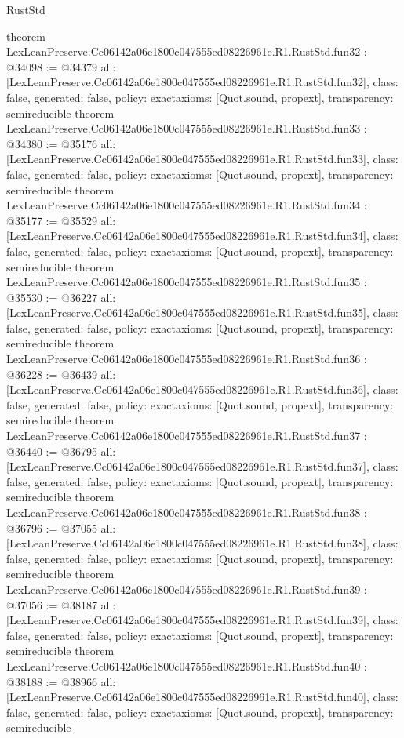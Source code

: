 \begin{lexlean}{RustStd}
\begin{coremodule}
{}
theorem LexLeanPreserve.Cc06142a06e1800c047555ed08226961e.R1.RustStd.fun32 : @34098 := @34379 {
  all: [LexLeanPreserve.Cc06142a06e1800c047555ed08226961e.R1.RustStd.fun32],
  class: false,
  generated: false,
  policy: exact{axioms: [Quot.sound, propext]},
  transparency: semireducible
}
theorem LexLeanPreserve.Cc06142a06e1800c047555ed08226961e.R1.RustStd.fun33 : @34380 := @35176 {
  all: [LexLeanPreserve.Cc06142a06e1800c047555ed08226961e.R1.RustStd.fun33],
  class: false,
  generated: false,
  policy: exact{axioms: [Quot.sound, propext]},
  transparency: semireducible
}
theorem LexLeanPreserve.Cc06142a06e1800c047555ed08226961e.R1.RustStd.fun34 : @35177 := @35529 {
  all: [LexLeanPreserve.Cc06142a06e1800c047555ed08226961e.R1.RustStd.fun34],
  class: false,
  generated: false,
  policy: exact{axioms: [Quot.sound, propext]},
  transparency: semireducible
}
theorem LexLeanPreserve.Cc06142a06e1800c047555ed08226961e.R1.RustStd.fun35 : @35530 := @36227 {
  all: [LexLeanPreserve.Cc06142a06e1800c047555ed08226961e.R1.RustStd.fun35],
  class: false,
  generated: false,
  policy: exact{axioms: [Quot.sound, propext]},
  transparency: semireducible
}
theorem LexLeanPreserve.Cc06142a06e1800c047555ed08226961e.R1.RustStd.fun36 : @36228 := @36439 {
  all: [LexLeanPreserve.Cc06142a06e1800c047555ed08226961e.R1.RustStd.fun36],
  class: false,
  generated: false,
  policy: exact{axioms: [Quot.sound, propext]},
  transparency: semireducible
}
theorem LexLeanPreserve.Cc06142a06e1800c047555ed08226961e.R1.RustStd.fun37 : @36440 := @36795 {
  all: [LexLeanPreserve.Cc06142a06e1800c047555ed08226961e.R1.RustStd.fun37],
  class: false,
  generated: false,
  policy: exact{axioms: [Quot.sound, propext]},
  transparency: semireducible
}
theorem LexLeanPreserve.Cc06142a06e1800c047555ed08226961e.R1.RustStd.fun38 : @36796 := @37055 {
  all: [LexLeanPreserve.Cc06142a06e1800c047555ed08226961e.R1.RustStd.fun38],
  class: false,
  generated: false,
  policy: exact{axioms: [Quot.sound, propext]},
  transparency: semireducible
}
theorem LexLeanPreserve.Cc06142a06e1800c047555ed08226961e.R1.RustStd.fun39 : @37056 := @38187 {
  all: [LexLeanPreserve.Cc06142a06e1800c047555ed08226961e.R1.RustStd.fun39],
  class: false,
  generated: false,
  policy: exact{axioms: [Quot.sound, propext]},
  transparency: semireducible
}
theorem LexLeanPreserve.Cc06142a06e1800c047555ed08226961e.R1.RustStd.fun40 : @38188 := @38966 {
  all: [LexLeanPreserve.Cc06142a06e1800c047555ed08226961e.R1.RustStd.fun40],
  class: false,
  generated: false,
  policy: exact{axioms: [Quot.sound, propext]},
  transparency: semireducible
}
\end{coremodule}
\end{lexlean}
